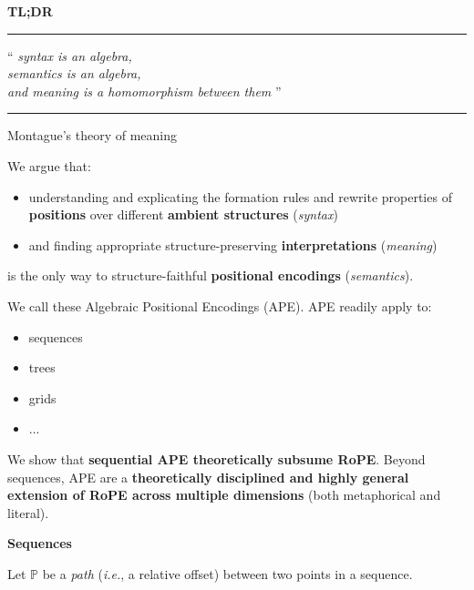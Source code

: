 \documentclass{article}
\newcommand{\sectionfont}{\fontsize{34}{34}\selectfont\setlength{\parskip}{1\baselineskip}}
\newcommand{\nfont}{\fontsize{21}{22}\selectfont\setlength{\parskip}{1\baselineskip}}
\newcommand{\light}[1]{\textcolor{gray!90}{#1}}
\newcommand{\Path}{\ensuremath{\mathbb{P}}}
\newcommand{\ape}{{APE}}
\newcommand{\rope}{{RoPE}}
\newcommand{\ie}{\textit{i.e.},}
\begin{document}
	\begin{minipage}[t]{0.29\textwidth}
		\sectionfont
		\textbf{TL;DR}
		
		\nfont	
		\hfill\rule[0\baselineskip]{0.65\textwidth}{1pt}
		
		\hfill\begin{minipage}{0.65\textwidth}
		``\textit{%
					syntax is an algebra,\\
					semantics is an algebra,\\
					and meaning is a homomorphism between them%
				}''\\
		\end{minipage}
		\vspace{-\baselineskip}
		\hfill\rule{.65\textwidth}{1pt}
		
		\hfill Montague's theory of meaning
		
		We argue that:
		\begin{itemize}[topsep=-1\baselineskip,noitemsep]
			\item understanding and explicating the formation rules and rewrite properties of \textbf{positions} over different \textbf{ambient structures} (\textit{syntax})
			\item and finding appropriate structure-preserving \textbf{interpretations} (\textit{meaning})
		\end{itemize}
		is the only way to structure-faithful \textbf{positional encodings} (\textit{semantics}).
		
		We call these Algebraic Positional Encodings (\ape). APE readily apply to:
		\begin{itemize}[topsep=-1\baselineskip,noitemsep]
			\item sequences
			\item trees
			\item grids
			\item ...
		\end{itemize}\vspace{\baselineskip}

		We show that \textbf{sequential \ape{} theoretically subsume \rope}. 	Beyond sequences, \ape{} are a \textbf{theoretically disciplined and highly general extension of \rope{} across multiple dimensions} \light{(both metaphorical and literal)}.
		
		\sectionfont
		\vspace{\parskip}
		\textbf{Sequences}
		
		\nfont
		Let $\Path$ be a \textit{path} (\ie{} a relative offset) between two points in a sequence.
		

\end{minipage}
\end{document}
